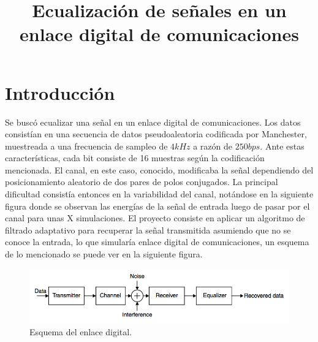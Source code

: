 \title{Ecualización de señales en un enlace digital de comunicaciones}

\author{
}

\maketitle

\begin{abstract}
\end{abstract}


\section{Introducción}
Se buscó ecualizar una señal en un enlace digital de comunicaciones. 
Los datos consistían en una secuencia de datos pseudoaleatoria 
codificada por Manchester, muestreada a una frecuencia de sampleo
 de $4kHz$ a razón de $250bps$. Ante estas características, cada bit consiste de 
 16 muestras según la codificación mencionada. El canal, en este caso, conocido, 
 modificaba la señal dependiendo del posicionamiento
 aleatorio de dos pares de polos conjugados.
La principal dificultad consistía entonces en la variabilidad del canal, 
notándose en la siguiente figura donde se observan las energías 
de la señal de entrada luego de pasar por el canal para unas 
X simulaciones.\newline
El proyecto consiste en aplicar un algoritmo de filtrado adaptativo
 para recuperar la señal transmitida asumiendo que no se conoce la entrada, 
 lo que simularía enlace digital de comunicaciones, un esquema de lo mencionado
se puede ver en la siguiente figura.

\begin{figure}[h]
    \centering
    \includegraphics[scale=0.5]{imagenes/preblock.png}
    \caption{Esquema del enlace digital.}
\end{figure}


